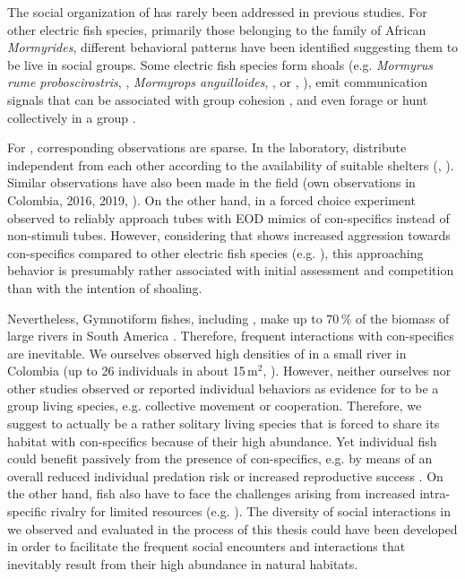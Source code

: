 The social organization of \lepto{} has rarely been addressed in previous studies. For other electric fish species, primarily those belonging to the family of African \textit{Mormyrides}, different behavioral patterns have been identified suggesting them to be live in social groups. Some electric fish species form shoals (e.g. \textit{Mormyrus rume proboscirostris}, \citealp{Worm2021}, \textit{Mormyrops anguilloides}, \citealp{Arnegard2005}, or \Eigenmannia, \citealp{Oestreich2005}), emit communication signals that can be associated with group cohesion \citep{Arnegard2005, Worm2021}, and even forage or hunt collectively in a group \citep{Arnegard2005, Bastos2021}. 

For \lepto{}, corresponding observations are sparse. In the laboratory, \lepto{} distribute independent from each other according to the availability of suitable shelters (, ). Similar observations have also been made in the field (own observations in Colombia, 2016, 2019, \citealp{Stamper2010}). On the other hand, in a forced choice experiment \citet{Stamper2010} observed \lepto{} to reliably approach tubes with EOD mimics of con-specifics instead of non-stimuli tubes. However, considering that \lepto{} shows increased aggression towards con-specifics compared to other electric fish species (e.g. \citealp{Triefenbach2008}), this approaching behavior is presumably rather associated with initial assessment and competition than with the intention of shoaling. 

Nevertheless, Gymnotiform fishes, including \lepto{}, make up to 70\,\% of the biomass of large rivers in South America \citep{Marrero1991, Cox2004, Crampton2011}. Therefore, frequent interactions with con-specifics are inevitable. We ourselves observed high densities of \lepto{} in a small river in Colombia (up to 26 individuals in about 15\,m$^2$, ). However, neither ourselves nor other studies observed or reported individual behaviors as evidence for \lepto{} to be a group living species, e.g. collective movement or cooperation. Therefore, we suggest \lepto{} to actually be a rather solitary living species that is forced to share its habitat with con-specifics because of their high abundance. Yet individual fish could benefit passively from the presence of con-specifics, e.g. by means of an overall reduced individual predation risk or increased reproductive success \citep{Cote1995, Clutton-Brock1999, Sword2005, Bilde2007}. On the other hand, fish also have to face the challenges arising from increased intra-specific rivalry for limited resources (e.g. \citealp{Janson1985, Chapman1995, Markham2017}). The diversity of social interactions in \lepto{} we observed and evaluated in the process of this thesis could have been developed in order to facilitate the frequent social encounters and interactions that inevitably result from their high abundance in natural habitats.

